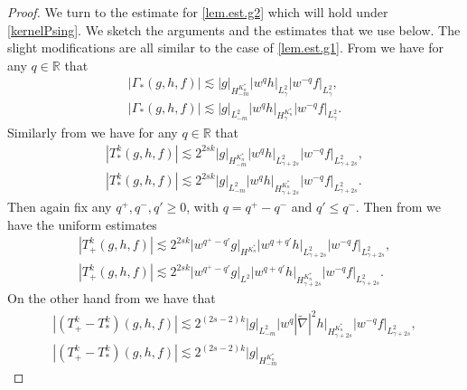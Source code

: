 \documentclass{amsart}
\numberwithin{equation}{section}
\begin{document}
\begin{proof}
We turn to the estimate for \eqref{lem.est.g2} which will hold under \eqref{kernelPsing}.  We sketch the arguments and the estimates that we use below.  The slight modifications are all similar to the case of \eqref{lem.est.g1}.  From \cite[Proposition 4.4]{gsNonCut0} we have for any ${q}\in{\mathbb{R}}$ that 
\begin{gather*}
\left| {\Gamma_{*}} (g,h,f)   \right|  \lesssim
      {|} g{|}_{H^{K^*_n}_{-m}} 
  {|} w^{q} h{|}_{L^2_{\gamma}} 
 {|} w^{-{q}} f{|}_{L^2_{\gamma}},
 \label{tstarCf} 
 \\
  \left| {\Gamma_{*}}(g,h,f) \right|   \lesssim  
 {|} g{|}_{L^2_{-m}} 
| w^{q} h |_{H^{K^*_n}_{\gamma}} | w^{-{q}} f |_{L^2_{\gamma}}.
 \label{tstarCh}
\end{gather*}
Similarly from \cite[Proposition 4.2]{gsNonCut0} we have for any ${q}\in{\mathbb{R}}$ that 
\begin{gather*}
  \left| {T^{k}_{*}}(g,h,f) \right|   \lesssim 
  2^{2sk}    {|} g{|}_{H^{K^*_n}_{-m}} 
  {|} w^{q} h{|}_{L^2_{\gamma + 2s}} 
 {|} w^{-{q}} f{|}_{L^2_{\gamma + 2s}},
 \label{tstarg} 
 \\
  \left| {T^{k}_{*}}(g,h,f) \right|   \lesssim 2^{2sk} 
 {|} g{|}_{L^2_{-m}} 
| w^{q} h |_{H^{K^*_n}_{\gamma + 2s}} 
| w^{-{q}} f |_{L^2_{\gamma + 2s}}.
 \label{tstarh}
\end{gather*}
Then again fix  any ${q}^+, {q}^-, {q}' \ge 0$,
with ${q} = {q}^+ - {q}^-$ and   $ {q}' \le {q}^-$.  Then from \cite[Proposition 4.3]{gsNonCut0} we have the uniform estimates 
\begin{gather*}
\left|  {T^{k}_{+}}(g,h,f)  \right| \lesssim    
2^{2sk} 
 {|} w^{{q}^+ - {q}'} g{|}_{H^{K^*_n}} 
{|} w^{{q} + {q}'} h{|}_{L^2_{\gamma + 2s}} 
{|} w^{-{q}} f{|}_{L^2_{\gamma + 2s}},
 \label{tplussmallN}
\\
\left|  {T^{k}_{+}}(g,h,f)  \right| \lesssim    
2^{2sk} 
{|} w^{{q}^+ - {q}'} g{|}_{L^2} 
 {|} w^{{q} + {q}'} h{|}_{H^{K^*_n}_{\gamma + 2s} }
{|} w^{-{q}} f{|}_{L^2_{\gamma + 2s}}.
 \label{tplussmall2N}
\end{gather*}
On the other hand from \cite[Proposition 4.6]{gsNonCut0} we have that
\begin{gather*}
\label{cancelh2g1}
 \left| ({T^{k}_{+}}- {T^{k}_{*}})(g,h,f) \right| 
   \lesssim 2^{(2s-2)k} 
    {|} g{|}_{L^2_{-m}} 
{|} w^{q}  |\tilde{\nabla}|^2 h {|}_{H^{K^*_n}_{\gamma+2s}} 
  {|} w^{-{q}} f{|}_{L^2_{\gamma+2s}},
\\
 \left| ({T^{k}_{+}}- {T^{k}_{*}})(g,h,f) \right| 
   \lesssim 2^{(2s-2)k} 
{|}  g{|}_{H^{K^*_n}_{-m}}

\end{gather*}
\end{proof}
\end{document}
